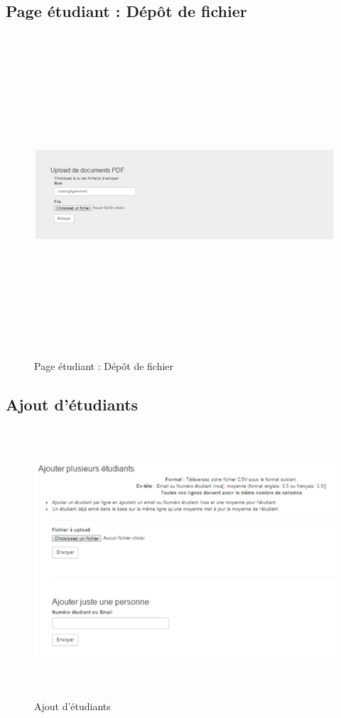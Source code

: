           \subsection{Page étudiant : Dépôt de fichier}
          \label{ef}
          \begin{figure}[H]
          	\centering
          	\includegraphics[width=16cm,height=12cm]{Images/Admin/ajout_fichier_admin.png}
          	\caption{Page étudiant : Dépôt de fichier}
          	
          \end{figure}
          
          \subsection{Ajout d'étudiants}
          \label{aet}
          \begin{figure}[H]
          	\centering
          	\includegraphics[width=14cm,height=10cm]{Images/Admin/ajout_etud_admin.png}
          	\caption{Ajout d'étudiants}
          	
          \end{figure}
        


